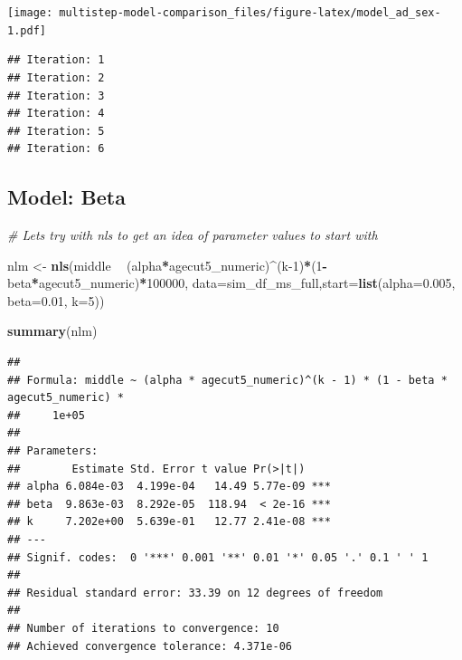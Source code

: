 \documentclass[
]{article}
\newenvironment{Shaded}{\begin{snugshade}}{\end{snugshade}}
\newcommand{\CommentTok}[1]{\textcolor[rgb]{0.56,0.35,0.01}{\textit{#1}}}
\newcommand{\DataTypeTok}[1]{\textcolor[rgb]{0.13,0.29,0.53}{#1}}
\newcommand{\DecValTok}[1]{\textcolor[rgb]{0.00,0.00,0.81}{#1}}
\newcommand{\FloatTok}[1]{\textcolor[rgb]{0.00,0.00,0.81}{#1}}
\newcommand{\KeywordTok}[1]{\textcolor[rgb]{0.13,0.29,0.53}{\textbf{#1}}}
\newcommand{\NormalTok}[1]{#1}
\newcommand{\OperatorTok}[1]{\textcolor[rgb]{0.81,0.36,0.00}{\textbf{#1}}}
\newcommand{\StringTok}[1]{\textcolor[rgb]{0.31,0.60,0.02}{#1}}
\begin{document}
\texttt{[image: multistep-model-comparison\_files/figure-latex/model\_ad\_sex-1.pdf]}

\begin{verbatim}
## Iteration: 1
## Iteration: 2
## Iteration: 3
## Iteration: 4
## Iteration: 5
## Iteration: 6
\end{verbatim}

\hypertarget{model-beta}{%
\subsection{Model: Beta}\label{model-beta}}

\begin{Shaded}
\begin{Highlighting}[]
\CommentTok{# Lets try with nls to get an idea of parameter values to start with}

\NormalTok{nlm <-}\StringTok{ }\KeywordTok{nls}\NormalTok{(middle }\OperatorTok{~}\StringTok{ }\NormalTok{(alpha}\OperatorTok{*}\NormalTok{agecut5_numeric)}\OperatorTok{^}\NormalTok{(k}\DecValTok{-1}\NormalTok{)}\OperatorTok{*}\NormalTok{(}\DecValTok{1}\OperatorTok{-}\NormalTok{beta}\OperatorTok{*}\NormalTok{agecut5_numeric)}\OperatorTok{*}\DecValTok{100000}\NormalTok{, }\DataTypeTok{data=}\NormalTok{sim_df_ms_full,}\DataTypeTok{start=}\KeywordTok{list}\NormalTok{(}\DataTypeTok{alpha=}\FloatTok{0.005}\NormalTok{, }\DataTypeTok{beta=}\FloatTok{0.01}\NormalTok{, }\DataTypeTok{k=}\DecValTok{5}\NormalTok{))}

\KeywordTok{summary}\NormalTok{(nlm)}
\end{Highlighting}
\end{Shaded}

\begin{verbatim}
## 
## Formula: middle ~ (alpha * agecut5_numeric)^(k - 1) * (1 - beta * agecut5_numeric) * 
##     1e+05
## 
## Parameters:
##        Estimate Std. Error t value Pr(>|t|)    
## alpha 6.084e-03  4.199e-04   14.49 5.77e-09 ***
## beta  9.863e-03  8.292e-05  118.94  < 2e-16 ***
## k     7.202e+00  5.639e-01   12.77 2.41e-08 ***
## ---
## Signif. codes:  0 '***' 0.001 '**' 0.01 '*' 0.05 '.' 0.1 ' ' 1
## 
## Residual standard error: 33.39 on 12 degrees of freedom
## 
## Number of iterations to convergence: 10 
## Achieved convergence tolerance: 4.371e-06
\end{verbatim}
\end{document}
